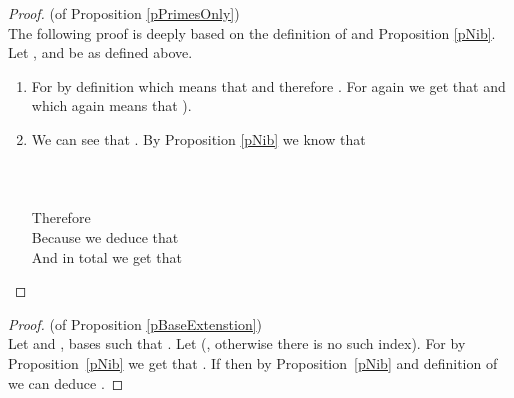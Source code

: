 \documentclass[envcountsame]{llncs}
\begin{document}
 \begin{proof}(of Proposition \ref{pPrimesOnly})
	 \\The following proof is deeply based on the definition of  and Proposition \ref{pNib}.\\
	Let ,  and  be as defined above.
	\begin{enumerate}
		\item 
			For   by definition  
			which means that  and therefore . 
			For   again we get that  
			and   which again means that ). 
		\item 
  			We can see that .  By Proposition \ref{pNib} we know that \\
			\\
			\\
			\\
			Therefore \   \\
			 Because  we deduce that \  \\
			And in total we get that  \\
				
	\end{enumerate}
\end{proof} \bigskip 

\begin{proof}(of Proposition \ref{pBaseExtenstion})\\
Let  and , bases such that .
Let  (, otherwise there is no such index).
For  by Proposition~\ref{pNib} we get that
 .
If  then by Proposition~\ref{pNib} and definition of  we can deduce .
\end{proof}
\end{document}
